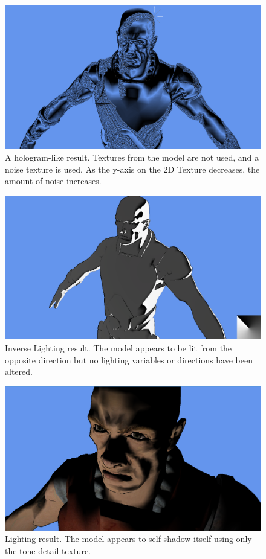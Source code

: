 \documentclass[annual]{acmsiggraph}
\begin{document}
\begin{figure}[h]
	\centering
	\includegraphics[width=5.5in]{images/hologram}
	\caption{A hologram-like result. Textures from the model are not used, and a noise texture is used. As the y-axis on the 2D Texture decreases, the amount of noise increases.}
	\label{fig:hologram}
\end{figure}

\begin{figure}[h]
	\centering
	\includegraphics[width=5.5in]{images/inverse_lighting}
	\caption{Inverse Lighting result. The model appears to be lit from the opposite direction but no lighting variables or directions have been altered.}
	\label{fig:inverseLighting}
\end{figure}

\begin{figure}[h]
	\centering
	\includegraphics[width=5.5in]{images/lighting}
	\caption{Lighting result. The model appears to self-shadow itself using only the tone detail texture.}
	\label{fig:lightingResult}
\end{figure}
\end{document}
